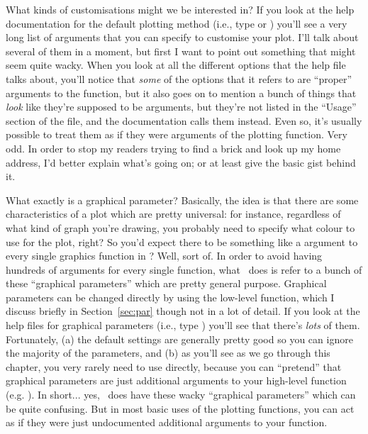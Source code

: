 What kinds of customisations might we be interested in? If you look at the help documentation for the default plotting method (i.e., type  or ) you'll see a very long list of arguments that you can specify to customise your plot. I'll talk about several of them in a moment, but first I want to point out something that might seem quite wacky. When you look at all the different options that the help file talks about, you'll notice that {\it some} of the options that it refers to are ``proper'' arguments to the  function, but it also goes on to mention a bunch of things that {\it look} like they're supposed to be arguments, but they're not listed in the ``Usage'' section of the file, and the documentation calls them  instead. Even so, it's usually possible to treat them as if they were arguments of the plotting function. Very odd. In order to stop my readers trying to find a brick and look up my home address, I'd better explain what's going on; or at least give the basic gist behind it. 

What exactly is a graphical parameter? Basically, the idea is that there are some characteristics of a plot which are pretty universal: for instance, regardless of what kind of graph you're drawing, you probably need to specify what colour to use for the plot, right? So you'd expect there to be something like a  argument to every single graphics function in \R? Well, sort of. In order to avoid having hundreds of arguments for every single function, what \R\ does is refer to a bunch of these ``graphical parameters'' which are pretty general purpose. Graphical parameters can be changed directly by using the low-level  function, which I discuss briefly in Section~\ref{sec:par} though not in a lot of detail. If you look at the help files for graphical parameters (i.e., type ) you'll see that there's {\it lots} of them. Fortunately, (a) the default settings are generally pretty good so you can ignore the majority of the parameters, and (b) as you'll see as we go through this chapter, you very rarely need to use  directly, because you can ``pretend'' that graphical parameters are just additional arguments to your high-level function (e.g. ). In short... yes, \R\ does have these wacky ``graphical parameters'' which can be quite confusing. But in most basic uses of the plotting functions, you can act as if they were just undocumented additional arguments to your function.

